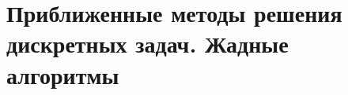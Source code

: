 \documentclass[discrete.tex]{subfiles}
\begin{document}
  \section{Приближенные методы решения дискретных задач. Жадные алгоритмы}
  
\end{document}
